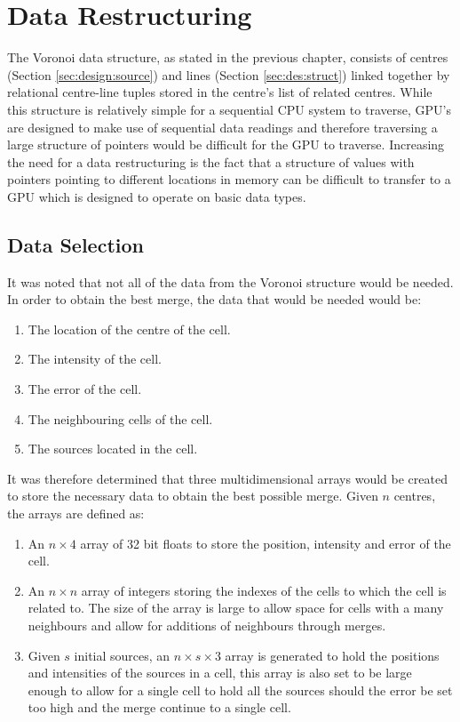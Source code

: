 \section{Data Restructuring}
The Voronoi data structure, as stated in the previous chapter, consists of centres (Section \ref{sec:design:source}) and lines (Section \ref{sec:des:struct}) linked together by relational centre-line tuples stored in the centre's  list of related centres. While this structure is relatively simple for a sequential CPU system to traverse, GPU's are designed to make use of sequential data readings and therefore traversing a large structure of pointers would be difficult for the GPU to traverse. Increasing the need for a data restructuring is the fact that a structure of values with pointers pointing to different locations in memory can be difficult to transfer to a GPU which is designed to operate on basic data types.
\subsection{Data Selection}
It was noted that not all of the data from the Voronoi structure would be needed. In order to obtain the best merge, the data that would be needed would be:
\begin{enumerate}
\item The location of the centre of the cell.
\item The intensity of the cell.
\item The error of the cell.
\item The neighbouring cells of the cell.
\item The sources located in the cell.
\end{enumerate}
It was therefore determined that three multidimensional arrays would be created to store the necessary data to obtain the best possible merge. Given $n$ centres, the arrays are defined as:
\begin{enumerate}
\item An $n \times 4$ array of 32 bit floats to store the position, intensity and error of the cell.
\item An $n \times n$ array of integers storing the indexes of the cells to which the cell is related to. The size of the array is large to allow space for cells with a many neighbours and allow for additions of neighbours through merges.
\item Given $s$ initial sources, an $n \times s \times 3$ array is generated to hold the positions and intensities of the sources in a cell, this array is also set to be large enough to allow for a single cell to hold all the sources should the error be set too high and the merge continue to a single cell.
\end{enumerate}
%
